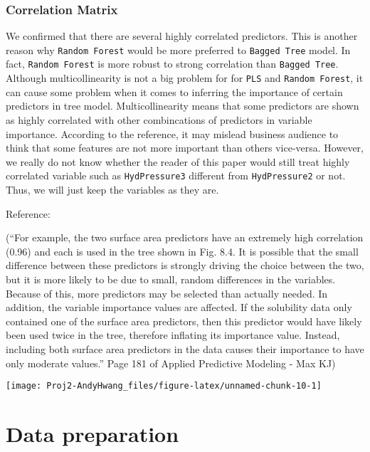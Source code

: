 \documentclass[]{report}
\begin{document}
\subsection{Correlation Matrix}\label{correlation-matrix}

We confirmed that there are several highly correlated predictors. This
is another reason why \texttt{Random\ Forest} would be more preferred to
\texttt{Bagged\ Tree} model. In fact, \texttt{Random\ Forest} is more
robust to strong correlation than \texttt{Bagged\ Tree}. Although
multicollinearity is not a big problem for for \texttt{PLS} and
\texttt{Random\ Forest}, it can cause some problem when it comes to
inferring the importance of certain predictors in tree model.
Multicollinearity means that some predictors are shown as highly
correlated with other combincations of predictors in variable
importance. According to the reference, it may mislead business audience
to think that some features are not more important than others
vice-versa. However, we really do not know whether the reader of this
paper would still treat highly correlated variable such as
\texttt{HydPressure3} different from \texttt{HydPressure2} or not. Thus,
we will just keep the variables as they are.

Reference:

(``For example, the two surface area predictors have an extremely high
correlation (0.96) and each is used in the tree shown in Fig. 8.4. It is
possible that the small difference between these predictors is strongly
driving the choice between the two, but it is more likely to be due to
small, random differences in the variables. Because of this, more
predictors may be selected than actually needed. In addition, the
variable importance values are affected. If the solubility data only
contained one of the surface area predictors, then this predictor would
have likely been used twice in the tree, therefore inflating its
importance value. Instead, including both surface area predictors in the
data causes their importance to have only moderate values.'' Page 181 of
Applied Predictive Modeling - Max KJ)

\begin{center}\texttt{[image: Proj2-AndyHwang\_files/figure-latex/unnamed-chunk-10-1]} \end{center}

\chapter{Data preparation}\label{data-preparation}
\end{document}
